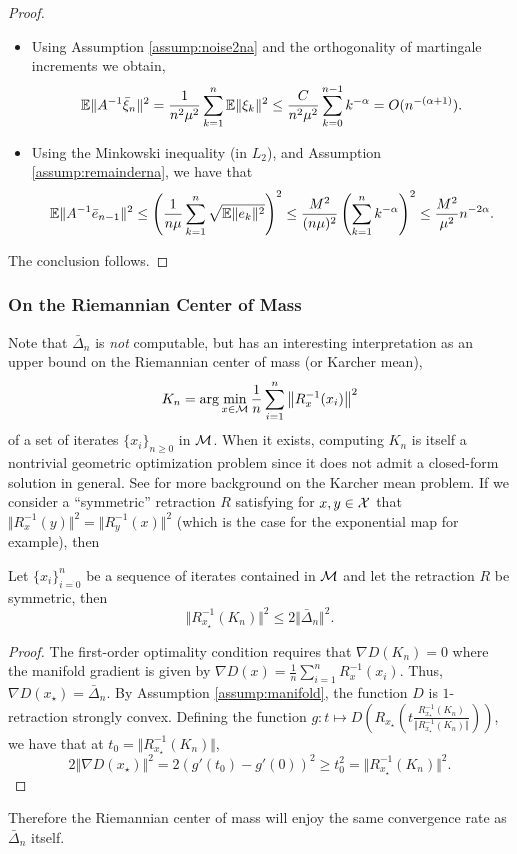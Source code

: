 \begin{proof}
\begin{itemize}
\item Using Assumption  \ref{assump:noise2na} and the orthogonality of martingale increments we obtain,
\[
\mathbb{E} \Vert  A^{-1} \bar  \xi_n \Vert^2 =\frac{1}{n^2 \mu^2} \sum_{k=1}^n \mathbb{E} \Vert \xi_k \Vert^2 \leq  \frac{C}{n^2 \mu^2} \sum_{k=0}^{n-1} k^{-\alpha} = O(n^{-(\alpha+1)}).
\]
\item Using the Minkowski inequality (in $L_2$), and Assumption  \ref{assump:remainderna},
we have that
\[
\mathbb{E} \Vert A^{-1} \bar e_{n-1}\Vert^2  \leq \left(\frac{1}{n\mu}\sum_{k=1}^n  \sqrt{\mathbb{E} \Vert e_k \Vert^2 }\right)^2\leq \frac{M^2}{(n \mu)^2} \left(\sum_{k=1}^n k^{-\alpha}\right)^2 \leq \frac{M^2}{\mu^2}n^{-2\alpha}.
\]
\end{itemize}
The conclusion follows.
\end{proof}
\subsubsection{On the Riemannian Center of Mass} \label{sec:com}
Note that $\bar{\Delta}_n$ is \textit{not} computable, but has an interesting interpretation as an upper bound on the Riemannian center of mass (or Karcher mean),
\[
K_n = \arg \min_{x \in \mathcal{M}} \frac{1}{n} \sum_{i=1}^{n} \norm{R_{x}^{-1}(x_i)}^2
\]
 of a set of iterates $\{ x_i \}_{n \geq 0}$ in $\mathcal{M}$. When it exists, computing $K_n$ is itself a nontrivial geometric optimization problem since it does not admit a closed-form solution in general.
See  \citet[][]{moakher2002means,bini2013computing,hosseini2015matrix} for more background on the Karcher mean problem.
If we consider a ``symmetric'' retraction $R$ satisfying for $x,y\in\mathcal{X}$ that $\Vert R_{x}^{-1}(y)\Vert^2=\Vert R_{y}^{-1}(x)\Vert^2$ (which is the case for the exponential map for example), then
\begin{lemma} \label{lem:karcher_mean}
  Let $\{ x_i \}_{i=0}^{n}$ be a sequence of iterates contained in $\mathcal{M}$ and let the retraction $R$ be symmetric, then
  \[\Vert R_{x_\star}^{-1}(K_n)\Vert^2\leq2\Vert\bar \Delta_n\Vert^2.\]
\end{lemma}
\begin{proof}
  The first-order optimality condition requires that $\nabla D(K_n) = 0$ where the manifold gradient is
  given by $\nabla D(x) = \frac{1}{n} \sum_{i=1}^{n} R_{x}^{-1}(x_i)$. Thus, $\nabla D(x_\star)=\bar \Delta_n$. By Assumption \ref{assump:manifold}, the function $D$ is $1$-retraction strongly convex. Defining the function  $g: t\mapsto D \left(R_{x_\star} (t \frac{R_{x_\star}^{-1}(K_n)}{\Vert R_{x_\star}^{-1}(K_n)\Vert })\right)$, we have that at $t_0= \Vert R_{x_\star}^{-1}(K_n)\Vert$,
  \[
     2\Vert \nabla D(x_\star)\Vert^2=2(g'(t_0)-g'(0))^2 \geq  {t_0^2} =\Vert R_{x_\star}^{-1}(K_n)\Vert^2.
     \]
\end{proof}
Therefore the Riemannian center of mass will enjoy the same convergence rate as $\bar \Delta_n$ itself.
